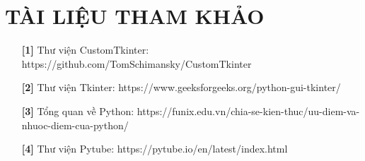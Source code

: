 \documentclass{article} %
\begin{document}
\section*{TÀI LIỆU THAM KHẢO}
\begin{itemize}
    \item[\textbf{[1]}] Thư viện CustomTkinter:  https://github.com/TomSchimansky/CustomTkinter 
    \item[\textbf{[2]}] Thư viện Tkinter: https://www.geeksforgeeks.org/python-gui-tkinter/ 
    \item[\textbf{[3]}] Tổng quan về Python: https://funix.edu.vn/chia-se-kien-thuc/uu-diem-va-nhuoc-diem-cua-python/ 
    \item[\textbf{[4]}] Thư viện Pytube: https://pytube.io/en/latest/index.html 
\end{itemize}
\newpage
\end{document}

